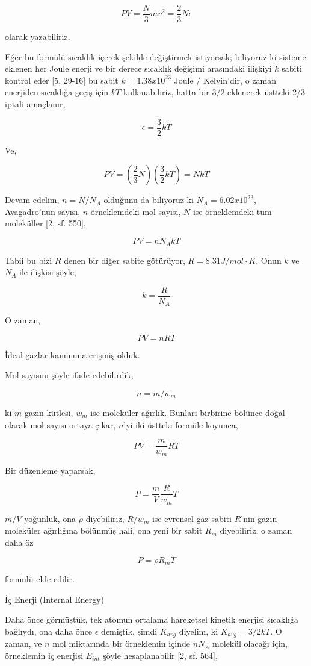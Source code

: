 \documentclass[12pt,fleqn]{article}\usepackage{../../common}
\begin{document}
$$
PV = \frac{N}{3} m \bar{v^2} = \frac{2}{3} N \epsilon
$$

olarak yazabiliriz.

Eğer bu formülü sıcaklık içerek şekilde değiştirmek istiyorsak; biliyoruz ki
sisteme eklenen her Joule enerji ve bir derece sıcaklık değişimi arasındaki
ilişkiyi $k$ sabiti kontrol eder [5, 29-16] bu sabit $k = 1.38 x 10^{23}$ Joule
/ Kelvin'dir, o zaman enerjiden sıcaklığa geçiş için $kT$ kullanabiliriz, hatta
bir $3/2$ eklenerek üstteki 2/3 iptali amaçlanır,

$$
\epsilon = \frac{3}{2} k T
$$

Ve,

$$
PV = \left( \frac{2}{3} N \right) \left( \frac{3}{2} k T \right) = N k T
$$

Devam edelim, $n = N / N_A$ olduğunu da biliyoruz ki $N_A = 6.02 x 10^{23}$,
Avagadro'nun sayısı, $n$ örneklemdeki mol sayısı, $N$ ise örneklemdeki tüm
moleküller [2, sf. 550],

$$
PV = n N_A k T
$$

Tabii bu bizi $R$ denen bir diğer sabite götürüyor, $R = 8.31 J/mol \cdot
K$. Onun $k$ ve $N_A$ ile ilişkisi şöyle,

$$
k = \frac{R}{N_A}
$$

O zaman,

$$
PV = n R T
$$

İdeal gazlar kanununa erişmiş olduk.


Mol sayısını şöyle ifade edebilirdik,

$$
n = m / w_m
$$

ki $m$ gazın kütlesi, $w_m$ ise moleküler ağırlık. Bunları birbirine bölünce
doğal olarak mol sayısı ortaya çıkar, $n$'yi iki üstteki formüle koyunca,

$$
PV = \frac{m}{w_m} R T
$$

Bir düzenleme yaparsak,

$$
P = \frac{m}{V} \frac{R}{w_m} T
$$

$m/V$ yoğunluk, ona $\rho$ diyebiliriz, $R / w_m$ ise evrensel gaz
sabiti $R$'nin gazın moleküler ağırlığına bölünmüş hali, ona
yeni bir sabit $R_m$ diyebiliriz, o zaman daha öz

$$
P = \rho R_m T
$$

formülü elde edilir.

İç Enerji (Internal Energy)

Daha önce görmüştük, tek atomun ortalama hareketsel kinetik enerjisi
sıcaklığa bağlıydı, ona daha önce $\epsilon$ demiştik, şimdi $K_{avg}$
diyelim, ki $K_{avg} = 3/2 k T$. O zaman, ve $n$ mol miktarında bir
örneklemin içinde $n N_A$ molekül olacağı için, örneklemin iç
enerjisi $E_{int}$ şöyle hesaplanabilir [2, sf. 564],
\end{document}
